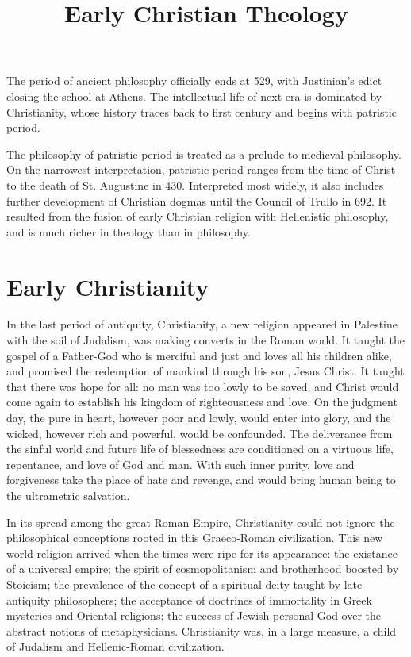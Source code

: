 \documentclass[11pt]{article}
\title{Early Christian Theology}
\date{}
\begin{document}
  \maketitle

  \linenumbers
The period of ancient philosophy officially ends at 529, with Justinian's edict closing the school at Athens. 
The intellectual life of next era is dominated by Christianity, whose history traces back to first century and begins with patristic period. 

\par

The philosophy of patristic period is treated as a prelude to medieval philosophy. 
On the narrowest interpretation, patristic period ranges from the time of Christ to the death of St. Augustine in 430. 
Interpreted most widely, it also includes further development of Christian dogmas until the Council of Trullo in 692.
It resulted from the fusion of early Christian religion with Hellenistic philosophy, and is much richer in theology than in philosophy. 

\section{Early Christianity}
In the last period of antiquity, Christianity, a new religion appeared in Palestine with the soil of Judalism, was making converts in the Roman world. 
It taught the gospel of a Father-God who is merciful and just and loves all his children alike, and promised the redemption of mankind through his son, Jesus Christ. 
It taught that there was hope for all: no man was too lowly to be saved, and Christ would come again to establish his kingdom of righteousness and love. 
On the judgment day, the pure in heart, however poor and lowly, would enter into glory, and the wicked, however rich and powerful, would be confounded. 
The deliverance from the sinful world and future life of blessedness are conditioned on a virtuous life, repentance, and love of God and man. 
With such inner purity, love and forgiveness take the place of hate and revenge, and would bring human being to the ultrametric salvation. 

\par

In its spread among the great Roman Empire, Christianity could not ignore the philosophical conceptions rooted in this Graeco-Roman civilization. 
This new world-religion arrived when the times were ripe for its appearance: 
the existance of a universal empire; 
the spirit of cosmopolitanism and brotherhood boosted by Stoicism; 
the prevalence of the concept of a spiritual deity taught by late-antiquity philosophers; 
the acceptance of doctrines of immortality in Greek mysteries and Oriental religions; 
the success of Jewish personal God over the abstract notions of metaphysicians. 
Christianity was, in a large measure, a child of Judalism and Hellenic-Roman civilization. 
\end{document}
